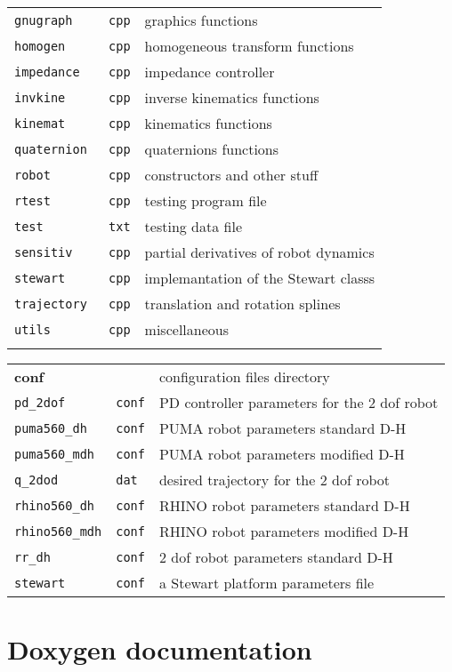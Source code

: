 \documentclass[dvips,11pt,fleqn]{report}
\begin{document}
{\begin{tabular}{lll}
{\tt gnugraph } & {\tt cpp} & graphics functions \\
{\tt homogen } & {\tt cpp} & homogeneous transform functions \\
{\tt impedance} & {\tt cpp} & impedance controller \\
{\tt invkine } & {\tt cpp} & inverse kinematics functions  \\
{\tt kinemat } & {\tt cpp} & kinematics functions  \\
{\tt quaternion } & {\tt cpp} & quaternions functions  \\
{\tt robot   } & {\tt cpp} & constructors and other stuff \\
{\tt rtest   } & {\tt cpp} & testing program file \\
{\tt test   } & {\tt txt} & testing data file \\
{\tt sensitiv} & {\tt cpp} & partial derivatives of robot dynamics \\
{\tt stewart} & {\tt cpp} & implemantation of the Stewart classs \\
{\tt trajectory} & {\tt cpp} & translation and rotation splines \\
{\tt utils} & {\tt cpp} & miscellaneous \\ \\
\end{tabular}

\begin{tabular}{lll}
{\bf conf} & & configuration files directory \\
\texttt{pd\_2dof} & \texttt{conf} & PD controller parameters for the 2 dof robot \\
\texttt{puma560\_dh} & \texttt{conf} & PUMA robot parameters standard D-H \\
\texttt{puma560\_mdh} & \texttt{conf} & PUMA robot parameters modified D-H \\
\texttt{q\_2dod} & \texttt{dat} & desired trajectory for the 2 dof robot \\
\texttt{rhino560\_dh} & \texttt{conf} & RHINO robot parameters standard D-H \\
\texttt{rhino560\_mdh} & \texttt{conf} & RHINO robot parameters modified D-H \\
\texttt{rr\_dh} & \texttt{conf} & 2 dof robot parameters standard D-H \\
\texttt{stewart} & \texttt{conf} & a Stewart platform parameters file 
\end{tabular}
}

\section{Doxygen documentation}
\end{document}
